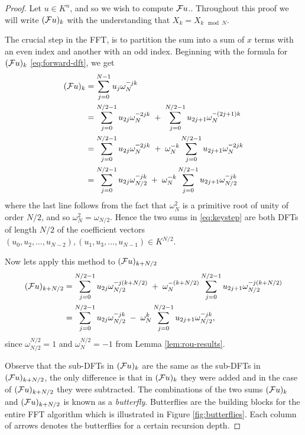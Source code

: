 \begin{proof}
    Let $u \in K^n$, and so we wish to compute $\mathcal Fu$.. Throughout this proof we will write $(\mathcal Fu)_k$ with the understanding that $X_{k} = X_{k \mod N}$.

    The crucial step in the FFT, is to partition the sum into a sum of $x$ terms with an even index and another with an odd index. Beginning with the formula for $(\mathcal Fu)_k$ \eqref{eq:forward-dft}, we get
    \begin{align}
        (\M{F}u)_k
        &= \sum^{N-1}_{j=0}u_j\omega_N^{\minus jk} \nonumber\\
        &= \sum^{N/2-1}_{j=0}u_{2j}\omega_N^{\minus 2jk} \;+\; \sum^{N/2-1}_{j=0}u_{2j+1} \omega_N^{\minus (2j+1)k} \nonumber\\
        &= \sum^{N/2-1}_{j=0}u_{2j}\omega_N^{\minus 2jk} \;+\; \omega_N^{-k} \sum^{N/2-1}_{j=0}u_{2j+1}\omega_N^{\minus 2jk}\\
        &= \sum^{N/2-1}_{j=0}u_{2j}\omega_{N/2}^{\minus jk} \;+\; \omega_N^{-k} \sum^{N/2-1}_{j=0}u_{2j+1}\omega_{N/2}^{\minus jk} \label{eq:keystep}
    \end{align}
    where the last line follows from the fact that $\omega_N^2$ is a primitive root of unity of order $N/2$, and so $\omega_N^2 = \omega_{N/2}$. Hence the two sums in \eqref{eq:keystep} are both DFTs of length $N/2$ of the coefficient vectors $(u_0, u_2, \ldots, u_{N-2}), (u_1, u_3, \ldots, u_{N-1}) \in K^{N/2}$. 

    Now lets apply this method to $(\mathcal Fu)_{k + N/2}$
    \begin{align*}
        (\M{F}u)_{k + N/2}
    &= \sum^{N/2-1}_{j=0}u_{2j}\omega_{N/2}^{\minus j(k + N/2)} \;+\; \omega_N^{-(k+ N/2)} \sum^{N/2-1}_{j=0}u_{2j+1}\omega_{N/2}^{\minus j(k + N/2)}\\
    &= \sum^{N/2-1}_{j=0}u_{2j}\omega_{N/2}^{\minus jk} \;-\; \omega_N^k \sum^{N/2-1}_{j=0}u_{2j+1}\omega_{N/2}^{\minus jk},
    \end{align*}
    since $\omega_{N/2}^{N/2} = 1$ and $\omega_N^{N/2} = -1$ from Lemma \ref{lem:rou-results}.

    Observe that the sub-DFTs in $(\mathcal Fu)_k$ are the same as the sub-DFTs in $(\mathcal Fu)_{k + N/2}$, the only difference is that in $(\mathcal Fu)_k$ they were added and in the case of $(\mathcal Fu)_{k + N/2}$ they were subtracted. The combinations of the two sums $(\mathcal Fu)_k$ and $(\mathcal Fu)_{k + N/2}$ is known as a \textit{butterfly}. Butterflies are the building blocks for the entire FFT algorithm which is illustrated in Figure \ref{fig:butterflies}. Each column of arrows denotes the butterflies for a certain recursion depth.
    

\end{proof}
